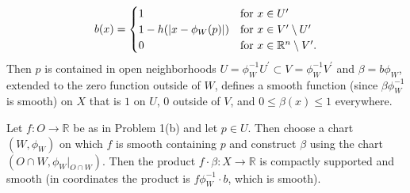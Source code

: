 \documentclass[11pt,leqno]{article}
\theoremstyle{plain}
\theoremstyle{definition}
\numberwithin{equation}{section}
\numberwithin{lem}{section}
\begin{document}
\begin{enumerate}
    \[b(x) = \begin{cases}
      1 & \text{for }x\in U^\prime\\
      1-h(\abs{x-\phi_W(p)}) & \text{for }x\in V^\prime\setminus U^\prime\\
      0 & \text{for } x\in \mathbb R^n\setminus V^\prime.
    \end{cases}\]
    Then $p$ is contained in open neighborhoods $U = \phi_W^{-1}U^\prime\subset V = \phi_W^{-1}V^\prime$ and $\beta = b\phi_W$, extended to the zero function outside of $W$, defines a smooth function (since $\beta\phi_W^{-1}$ is smooth) on $X$ that is $1$ on $U$, $0$ outside of $V$, and $0\leq \beta(x)\leq 1$ everywhere. 

    Let $f\colon O\to \mathbb R$ be as in Problem 1(b) and let $p\in U$. Then choose a chart $(W,\phi_W)$ on which $f$ is smooth containing $p$ and construct $\beta$ using the chart $(O\cap W,\phi_W|_{O\cap W})$. Then the product $f\cdot\beta\colon X\to\mathbb R$ is compactly supported and smooth (in coordinates the product is $f\phi_W^{-1}\cdot b$, which is smooth).
\end{enumerate}
\end{document}
